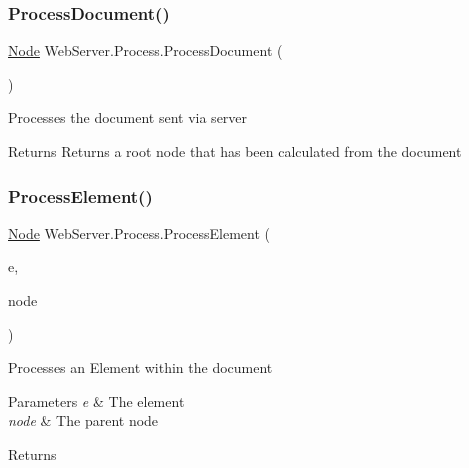\subsubsection{\texorpdfstring{Process\+Document()}{ProcessDocument()}}
{\footnotesize\ttfamily \hyperlink{class_web_server_1_1_node}{Node} Web\+Server.\+Process.\+Process\+Document (\begin{DoxyParamCaption}{ }\end{DoxyParamCaption})}



Processes the document sent via server 

\begin{DoxyReturn}{Returns}
Returns a root node that has been calculated from the document
\end{DoxyReturn}
\mbox{\label{class_web_server_1_1_process_ac7600e6ea07887aeb2f23f4e0a5dd01a}} 
\subsubsection{\texorpdfstring{Process\+Element()}{ProcessElement()}}
{\footnotesize\ttfamily \hyperlink{class_web_server_1_1_node}{Node} Web\+Server.\+Process.\+Process\+Element (\begin{DoxyParamCaption}\item[{X\+Element}]{e,  }\item[{\hyperlink{class_web_server_1_1_node}{Node}}]{node }\end{DoxyParamCaption})\hspace{0.3cm}{\ttfamily [private]}}



Processes an Element within the document 


\begin{DoxyParams}{Parameters}
{\em e} & The element\\
\hline
{\em node} & The parent node\\
\hline
\end{DoxyParams}
\begin{DoxyReturn}{Returns}

\end{DoxyReturn}
\mbox{\label{class_web_server_1_1_process_a8e79c8d25eca802ac7e09bba030cd2e2}} 
